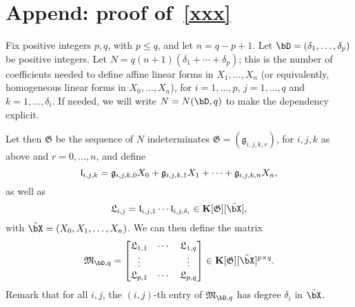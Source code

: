 \documentclass[12pt]{article}
\begin{document}








 


\section*{Append: proof of~\ref{xxx}}

Fix positive integers $p,q$, with $p \le q$, and let $n=q-p+1$. Let
$\bD=(\delta_1,\dots,\delta_p)$ be positive integers. Let $N=q(n+1)(\delta_1 + \cdots
+ \delta_p)$; this is the number of coefficients needed to define affine
linear forms in $X_1,\dots,X_n$ (or equivalently, homogeneous linear
forms in $X_0,\dots,X_n$), for $i=1,\dots,p$, $j=1,\dots,q$ and
$k=1,\dots,\delta_i$. If needed, we will write $N=N(\bD,q)$ to make the
dependency explicit.


Let then $\mathfrak{ G}$ be the sequence of $N$ indeterminates
$\mathfrak{G}=(\mathfrak{ g}_{i,j,k,r})$, for $i,j,k$ as above and
$r=0,\dots,n$, and define
$$\mathfrak{l}_{i,j,k} = \frak{g}_{i,j,k,0}X_0 + \frak{g}_{i,j,k,1} X_1 +\cdots + \frak{g}_{i,j,k,n} X_n,$$
as well as 
$$\mathfrak{L}_{i,j} = \mathfrak{ l}_{i,j,1} \cdots \mathfrak{l}_{i,j,\delta_i} \in \KK[\mathfrak{G}][\tilde\bX],$$
with $\tilde\bX=(X_0,X_1,\dots,X_n)$. We can then define the
matrix
\begin{align}\label{eq:matM}
\mathfrak{M}_{\bD,q}=\left [\begin{matrix}
\mathfrak{L}_{1,1} & \cdots & \mathfrak{L}_{1,q}\\
 \vdots & & \vdots\\
\mathfrak{L}_{p,1} & \cdots & \mathfrak{L}_{p,q}
  \end{matrix}\right ]\in \KK[\mathfrak{ G}][\tilde\bX]^{p\times q}.  
\end{align}
Remark that for all $i,j$, the $(i,j)$-th entry of
$\mathfrak{M}_{\bD,q}$ has degree $\delta_i$ in $\tilde \bX$.
\end{document}
